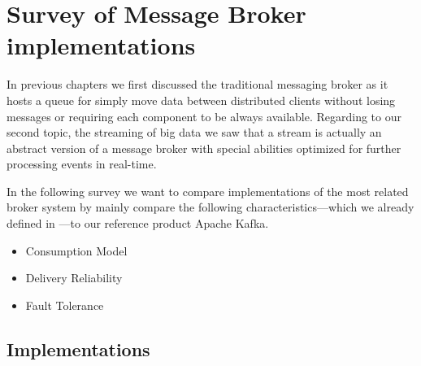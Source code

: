 \chapter{Survey of Message Broker implementations} 
\label{survey-broker}
In previous chapters we first discussed the traditional messaging broker as it
hosts a queue for simply move data between distributed clients without losing
messages or requiring each component to be always available. Regarding to our
second topic, the streaming of big data we saw that a stream is actually an
abstract version of a message broker with special abilities optimized for
further processing events in real-time. 

In the following survey we want to compare implementations of the most related
broker system by mainly compare the following characteristics---which we already
defined in ---to our reference product Apache Kafka. 

\begin{itemize}
\item Consumption Model 
     \item Delivery Reliability 
         \item Fault Tolerance
\end{itemize}

\section{Implementations}

